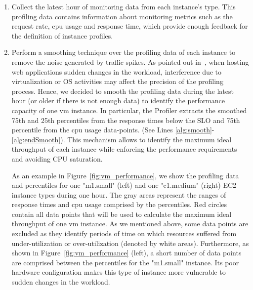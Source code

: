 \begin{enumerate}
\item Collect the latest hour of monitoring data from each instance's type. This profiling data contains information about monitoring metrics such as the request rate, cpu usage and response time, which provide enough feedback for the definition of instance profiles. 

\item Perform a smoothing technique over the profiling data of each instance to remove the noise generated by traffic spikes. As pointed out in~\cite{gandhi_hybrid_2012}, when hosting web applications sudden changes in the workload, interference due to virtualization or OS activities may affect the precision of the profiling process. Hence, we decided to smooth the profiling data during the latest hour (or older if there is not enough data) to identify the performance capacity of one vm instance. In particular, the Profiler extracts the smoothed 75th and 25th percentiles from the response times below the SLO and 75th percentile from the cpu usage data-points. (See Lines \ref{alg:smooth}-\ref{alg:endSmooth}). This mechanism allows to identify the maximum ideal throughput of each instance while enforcing the performance requirements and avoiding CPU saturation. 

As an example in Figure~\ref{fig:vm_performance}, we show the profiling data and percentiles for one "m1.small" (left) and one "c1.medium" (right) EC2 instance types during one hour. The gray areas represent the ranges of response times and cpu usage comprised by the percentiles. Red circles contain all data points that will be used to calculate the maximum ideal throughput of one vm instance. As we mentioned above, some data points are excluded as they identify periods of time on which resources suffered from under-utilization or over-utilization (denoted by white areas). Furthermore, as shown in Figure~\ref{fig:vm_performance} (left), a short number of data points are comprised between the percentiles for the "m1.small" instance. Its poor hardware configuration makes this type of instance more vulnerable to sudden changes in the workload.




\end{enumerate}
